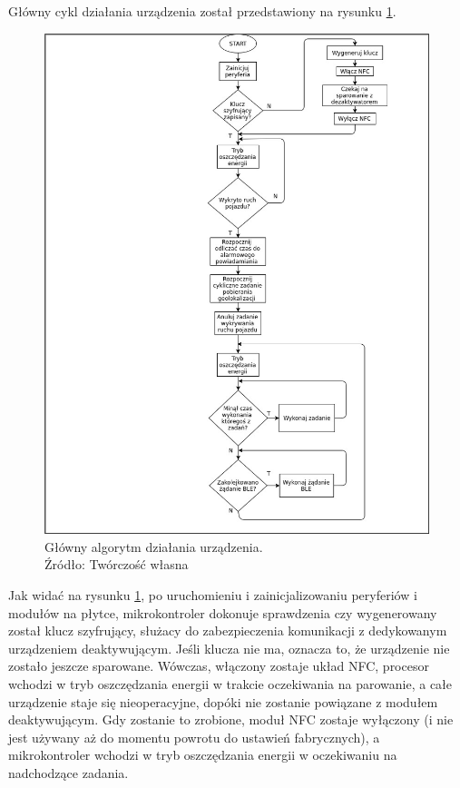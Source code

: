 Główny cykl działania urządzenia został przedstawiony na rysunku \ref{fig:image_soft_mainboard_main_alghoritm}.

\begin{figure}[H]
	\centering
	\includegraphics[width=16cm]{img/software/mainboard/Tracking_alghoritm.jpg}
	\caption{Główny algorytm działania urządzenia. 
	\\Źródło: Twórczość własna}
	\label{fig:image_soft_mainboard_main_alghoritm}
\end{figure}

Jak widać na rysunku \ref{fig:image_soft_mainboard_main_alghoritm}, po uruchomieniu i zainicjalizowaniu peryferiów i modułów na płytce, mikrokontroler dokonuje sprawdzenia czy wygenerowany został klucz szyfrujący, służacy do zabezpieczenia komunikacji z dedykowanym urządzeniem deaktywującym. Jeśli klucza nie ma, oznacza to, że urządzenie nie zostało jeszcze sparowane. Wówczas, włączony zostaje układ NFC, procesor wchodzi w tryb oszczędzania energii w trakcie oczekiwania na parowanie, a całe urządzenie staje się nieoperacyjne, dopóki nie zostanie powiązane z modułem deaktywującym. Gdy zostanie to zrobione, moduł NFC zostaje wyłączony (i nie jest używany aż do momentu powrotu do ustawień fabrycznych), a mikrokontroler wchodzi w tryb oszczędzania energii w oczekiwaniu na nadchodzące zadania.

